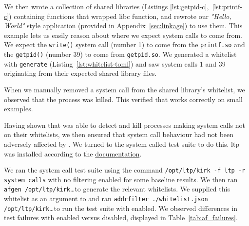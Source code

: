 We then wrote a collection of 
shared libraries (Listings \ref{lst:getpid-c},~\ref{lst:printf-c}) containing 
functions that wrapped \ac{libc} function, and rewrote our 
\textit{"Hello, World"} style application (provided in Appendix~\ref{sec:linkage})
to use them. This example lets us easily reason about where we expect system calls
to come from. We expect the \texttt{write()} system call (number 1) to come from 
the \texttt{printf.so} and the \texttt{getpid()} (number 39) to come from 
\texttt{getpid.so}. We generated a whitelist with \af \texttt{generate} 
(Listing~\ref{lst:whitelist-toml}) and saw system calls 1 and 39 originating from
their expected shared library files.

When we manually removed a system call from the shared library's whitelist, we 
observed that the process was killed. This verified that \af works correctly
on small examples.

Having shown that \af was able to detect and kill processes making system calls not
on their whitelists, we then ensured that system call behaviour had not been 
adversely affected by \af. We turned to the  system called test 
suite \cite{LINUX_TEST_PROJECT} to do this. \ac{ltp} was installed according to the
\href{https://linux-test-project.readthedocs.io/en/latest/users/quick_start.html}{documentation}.

We ran the system call test suite using the command \texttt{/opt/ltp/kirk -f ltp -r
system calls} with no filtering enabled for some baseline results. We then ran
\texttt{afgen /opt/ltp/kirk}\dots to generate the relevant
whitelists. We supplied this whitelist as an argument to \af and ran
\texttt{addrfilter ./whitelist.json /opt/ltp/kirk}\dots to run the test suite
with \af enabled. We observed differences in test failures with \af
enabled versus disabled, displayed in Table~\ref{tab:af_failures}.

